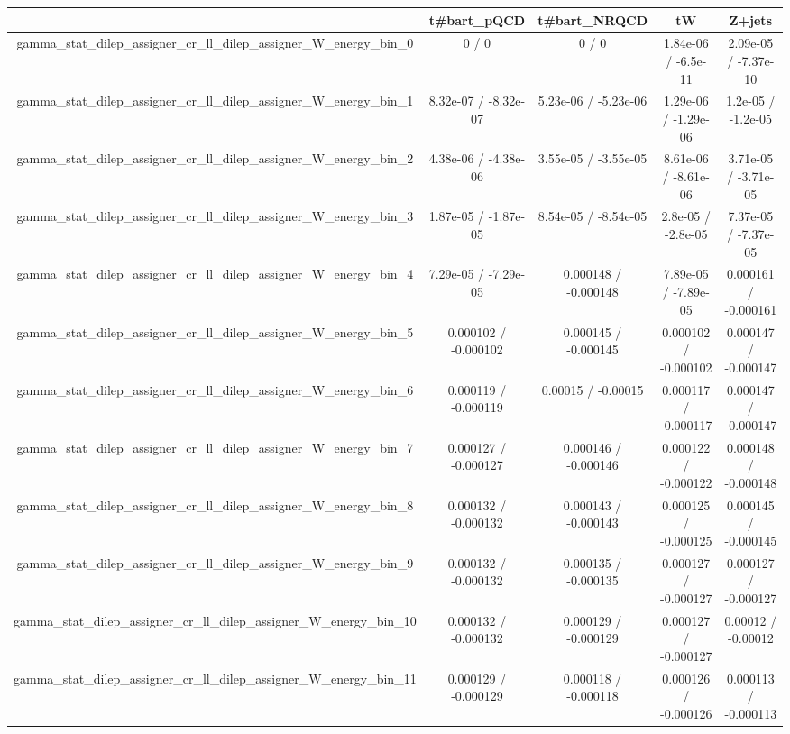 \documentclass[10pt]{article}
\begin{document}
\begin{table}[htbp]
\begin{center}
\begin{tabular}{|c|c|c|c|c|}
\hline 
      & t#bar{t}_{pQCD}      & t#bar{t}_{NRQCD}      & tW      & Z+jets \\ 
\hline 
  gamma_stat_dilep_assigner_cr_ll_dilep_assigner_W_energy_bin_0 & 0 / 0 & 0 / 0 & 1.84e-06 / -6.5e-11 & 2.09e-05 / -7.37e-10 \\ 
  gamma_stat_dilep_assigner_cr_ll_dilep_assigner_W_energy_bin_1 & 8.32e-07 / -8.32e-07 & 5.23e-06 / -5.23e-06 & 1.29e-06 / -1.29e-06 & 1.2e-05 / -1.2e-05 \\ 
  gamma_stat_dilep_assigner_cr_ll_dilep_assigner_W_energy_bin_2 & 4.38e-06 / -4.38e-06 & 3.55e-05 / -3.55e-05 & 8.61e-06 / -8.61e-06 & 3.71e-05 / -3.71e-05 \\ 
  gamma_stat_dilep_assigner_cr_ll_dilep_assigner_W_energy_bin_3 & 1.87e-05 / -1.87e-05 & 8.54e-05 / -8.54e-05 & 2.8e-05 / -2.8e-05 & 7.37e-05 / -7.37e-05 \\ 
  gamma_stat_dilep_assigner_cr_ll_dilep_assigner_W_energy_bin_4 & 7.29e-05 / -7.29e-05 & 0.000148 / -0.000148 & 7.89e-05 / -7.89e-05 & 0.000161 / -0.000161 \\ 
  gamma_stat_dilep_assigner_cr_ll_dilep_assigner_W_energy_bin_5 & 0.000102 / -0.000102 & 0.000145 / -0.000145 & 0.000102 / -0.000102 & 0.000147 / -0.000147 \\ 
  gamma_stat_dilep_assigner_cr_ll_dilep_assigner_W_energy_bin_6 & 0.000119 / -0.000119 & 0.00015 / -0.00015 & 0.000117 / -0.000117 & 0.000147 / -0.000147 \\ 
  gamma_stat_dilep_assigner_cr_ll_dilep_assigner_W_energy_bin_7 & 0.000127 / -0.000127 & 0.000146 / -0.000146 & 0.000122 / -0.000122 & 0.000148 / -0.000148 \\ 
  gamma_stat_dilep_assigner_cr_ll_dilep_assigner_W_energy_bin_8 & 0.000132 / -0.000132 & 0.000143 / -0.000143 & 0.000125 / -0.000125 & 0.000145 / -0.000145 \\ 
  gamma_stat_dilep_assigner_cr_ll_dilep_assigner_W_energy_bin_9 & 0.000132 / -0.000132 & 0.000135 / -0.000135 & 0.000127 / -0.000127 & 0.000127 / -0.000127 \\ 
  gamma_stat_dilep_assigner_cr_ll_dilep_assigner_W_energy_bin_10 & 0.000132 / -0.000132 & 0.000129 / -0.000129 & 0.000127 / -0.000127 & 0.00012 / -0.00012 \\ 
  gamma_stat_dilep_assigner_cr_ll_dilep_assigner_W_energy_bin_11 & 0.000129 / -0.000129 & 0.000118 / -0.000118 & 0.000126 / -0.000126 & 0.000113 / -0.000113 \\ 

\end{tabular}
\end{center}
\end{table}
\end{document}
